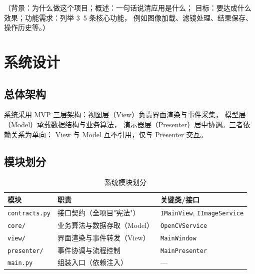 \documentclass[12pt,a4paper]{ctexart}
\begin{document}
（背景：为什么做这个项目；概述：一句话说清应用是什么；
目标：要达成什么效果；功能需求：列举 3~5 条核心功能，
例如图像加载、滤镜处理、结果保存、操作历史等。）

\section{系统设计}\label{sec:design}

\subsection{总体架构}


系统采用 MVP 三层架构：视图层（View）负责界面渲染与事件采集，
模型层（Model）承载数据结构与业务算法，
演示器层（Presenter）居中协调。三者依赖关系为单向：
View 与 Model 互不引用，仅与 Presenter 交互。

\subsection{模块划分}

\begin{table}[H]
    \centering
    \caption{系统模块划分}
    \label{tab:modules}
    \begin{tabular}{lll}
        \toprule
        模块 & 职责 & 关键类/接口 \\
        \midrule
        \texttt{contracts.py} & 接口契约（全项目"宪法"） & \texttt{IMainView}, \texttt{IImageService} \\
        \texttt{core/}        & 业务算法与数据存取（Model） & \texttt{OpenCVService} \\
        \texttt{view/}        & 界面渲染与事件转发（View） & \texttt{MainWindow} \\
        \texttt{presenter/}   & 事件协调与流程控制 & \texttt{MainPresenter} \\
        \texttt{main.py}      & 组装入口（依赖注入） & --- \\
        \bottomrule
    \end{tabular}
\end{table}
\end{document}
